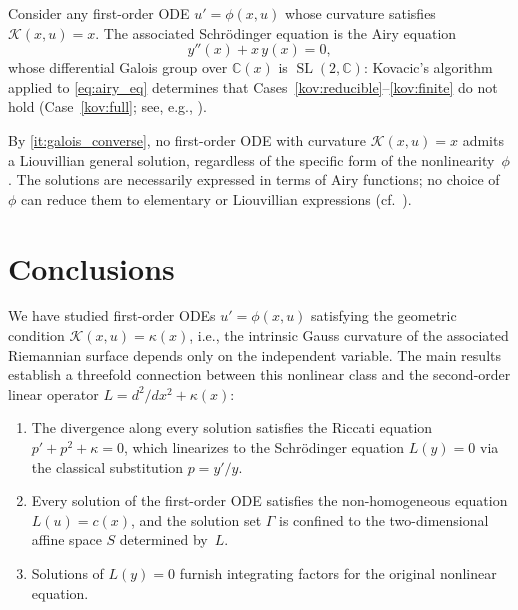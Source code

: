 \documentclass[preprint,a4paper]{elsarticle}
\begin{document}
\begin{example}\label{ex:airy}
Consider any first-order ODE $u'=\phi(x,u)$ whose curvature satisfies $\mathcal{K}(x,u)=x$. The associated Schr\"odinger equation is the Airy equation
\begin{equation}\label{eq:airy_eq}
y''(x)+x\,y(x) = 0,
\end{equation}
whose differential Galois group over $\mathbb{C}(x)$ is $\operatorname{SL}(2,\mathbb{C})$: Kovacic's algorithm applied to \eqref{eq:airy_eq} determines that Cases~\ref{kov:reducible}--\ref{kov:finite} do not hold (Case~\ref{kov:full}; see, e.g., \cite{Kovacic1986}).

By \ref{it:galois_converse}, no first-order ODE with curvature $\mathcal{K}(x,u)=x$ admits a Liouvillian general solution, regardless of the specific form of the nonlinearity~$\phi$. The solutions are necessarily expressed in terms of Airy functions; no choice of~$\phi$ can reduce them to elementary or Liouvillian expressions (cf.\ ).
\end{example}


\section{Conclusions}\label{sec:conclusions}

We have studied first-order ODEs $u'=\phi(x,u)$ satisfying the geometric condition $\mathcal{K}(x,u)=\kappa(x)$, i.e., the intrinsic Gauss curvature of the associated Riemannian surface depends only on the independent variable. The main results establish a threefold connection between this nonlinear class and the second-order linear operator $L=d^2/dx^2+\kappa(x)$:
\begin{enumerate}[label=\textup{(\roman*)}]
\item The divergence along every solution satisfies the Riccati equation $p'+p^2+\kappa=0$, which linearizes to the Schr\"odinger equation $L(y)=0$ via the classical substitution $p=y'/y$.
\item Every solution of the first-order ODE satisfies the non-homogeneous equation $L(u)=c(x)$, and the solution set $\Gamma$ is confined to the two-dimensional affine space $S$ determined by~$L$.
\item Solutions of $L(y)=0$ furnish integrating factors for the original nonlinear equation.
\end{enumerate}
\end{document}
